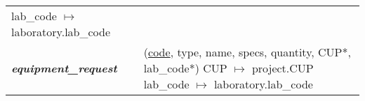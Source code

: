 \begin{tabular}{@{}l l}
{	lab\_code $\mapsto$ laboratory.lab\_code}                                                                                                        \\
	\textbf{\textit{equipment\_request}} & \makecell[lt]{(\underline{code}, type, name, specs, quantity,  CUP*, lab\_code*)                          \\
	CUP $\mapsto$ project.CUP                                                                                                                        \\
	lab\_code $\mapsto$ laboratory.lab\_code}                                                                                                        \\
\end{tabular}


